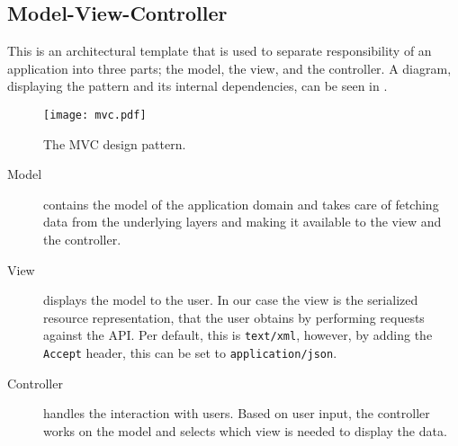 \subsection{Model-View-Controller\cite{aspmvc}} \label{webapi:mvc}
This is an architectural template that is used to separate responsibility of an application into three parts; the model, the view, and the controller.
A diagram, displaying the pattern and its internal dependencies, can be seen in .

\begin{figure}[h]
\begin{center}
\texttt{[image: mvc.pdf]}
\caption{The MVC design pattern.}
\label{mvcdiagram}
\end{center}
\end{figure}

\begin{description}
\item [Model] contains the model of the application domain and takes care of fetching data from the underlying layers and making it available to the view and the controller.

\item [View] displays the model to the user.
In our case the view is the serialized resource representation, that the user obtains by performing requests against the API.
Per default, this is \texttt{text/xml}, however, by adding the \texttt{Accept} header\cite[Section 14]{http_specification}, this can be set to \texttt{application/json}.

\item [Controller] handles the interaction with users.
Based on user input, the controller works on the model and selects which view is needed to display the data.
\end{description}
